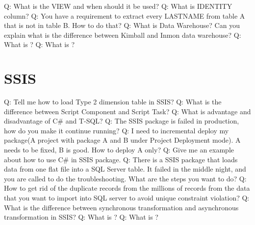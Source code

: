 \documentclass[a4paper,11pt]{article}
\begin{document}
\noindent 
Q: What is the VIEW and when should it be used? \newline \newline
\noindent 
Q: What is IDENTITY column? \newline \newline
\noindent 
Q: You have a requirement to extract every LASTNAME from table A that is not in table B. How to do that? \newline \newline
\noindent 
Q: What is Data Warehouse? Can you explain what is the difference between Kimball and Inmon data warehouse? \newline \newline
\noindent 
Q: What is ? \newline \newline
\noindent 
Q: What is ? \newline \newline

\section{SSIS}
Q: Tell me how to load Type 2 dimension table in SSIS? \newline \newline
\noindent 
Q: What is the difference between Script Component and Script Task? \newline \newline
\noindent 
Q: What is advantage and disadvantage of C\# and T-SQL? \newline \newline
\noindent 
Q: The SSIS package is failed in production, how do you make it continue running? \newline \newline
\noindent 
Q: I need to incremental deploy my package(A project with package A and B under Project Deployment mode). A needs to be fixed, B is good. How to deploy A only? \newline \newline
\noindent 
Q: Give me an example about how to use C\# in SSIS package. \newline \newline
\noindent 
Q: There is a SSIS package that loads data from one flat file into a SQL Server table. It failed in the middle night, and you are called to do the troubleshooting. What are the steps you want to do? \newline \newline
\noindent 
Q: How to get rid of the duplicate records from the millions of records from the data that you want to import into SQL server to avoid unique constraint violation? \newline \newline
\noindent 
Q: What is the difference between synchronous transformation and asynchronous transformation in SSIS? \newline \newline
\noindent 
Q: What is ? \newline \newline
\noindent 
Q: What is ? \newline \newline
\end{document}
